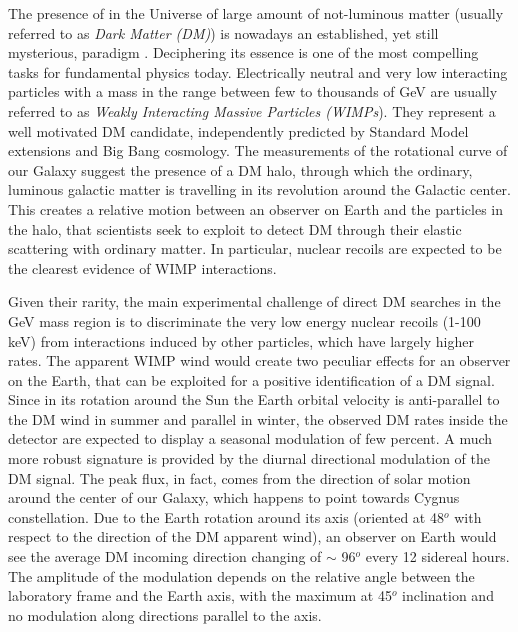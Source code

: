 \documentclass[physics,article,submit,moreauthors,pdftex]{Definitions/mdpi}
\begin{document}
The presence of in the Universe of large amount of not-luminous matter (usually referred to as {\it Dark Matter (DM)}) is nowadays an established, yet still mysterious, paradigm \cite{Bertone:2004pz}. Deciphering its essence is one of the most compelling tasks for fundamental physics today. Electrically neutral and very low interacting particles with a mass in the range between few to thousands of GeV are usually referred to as {\it Weakly Interacting Massive Particles (WIMPs}). They represent a well motivated DM candidate, independently predicted by Standard Model extensions and Big Bang cosmology. The measurements of the rotational curve of our Galaxy suggest the presence of a DM halo, through which the ordinary, luminous galactic matter is travelling in its revolution around the Galactic center. This creates a relative motion between an observer on Earth and the particles in the halo, that scientists seek to exploit to detect DM through their elastic scattering with ordinary matter. In particular, nuclear recoils are expected to be the clearest evidence of WIMP interactions.

Given their rarity, the main experimental challenge of direct DM searches in the GeV mass region is to discriminate the very low energy nuclear recoils (1-100 keV) from interactions induced by other particles, which have largely higher rates. The apparent WIMP wind would create two peculiar effects for an observer on the Earth, that can be exploited for a positive identification of a DM signal. Since in its rotation around the Sun the Earth orbital velocity is anti-parallel to the DM wind in summer and parallel in winter, the observed DM rates inside the detector are expected to display a seasonal modulation of few percent. A much more robust signature is provided by the diurnal directional modulation of the DM signal. The peak flux, in fact, comes from the direction of solar motion around the center of our Galaxy, which happens to point towards Cygnus constellation. Due to the Earth rotation around its axis (oriented at 48$^{o}$ with respect to the direction of the DM apparent wind), an observer on Earth would see the average DM incoming direction changing of $\sim$ 96$^{o}$ every 12 sidereal hours. The amplitude of the modulation depends on the relative angle between the laboratory frame and the Earth axis, with the maximum at 45$^{o}$ inclination and no modulation along directions parallel to the axis.
\end{document}
